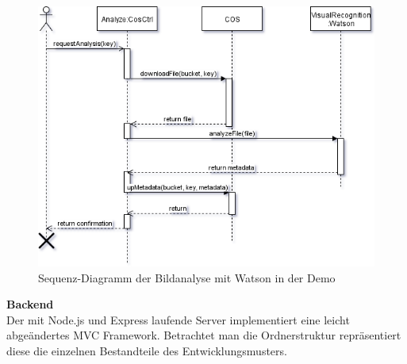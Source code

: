 \begin{figure}[hbt]
	\centering
	\includegraphics[scale=0.75]{images/demo-sequenz-diagram-watson}
	\caption{Sequenz-Diagramm der Bildanalyse mit Watson in der Demo}
	\label{fig:demosequenzdiagramwatson}
\end{figure}

\textbf{Backend}\\
Der mit Node.js und Express laufende Server implementiert eine leicht abgeändertes \ac{MVC} Framework. Betrachtet man die Ordnerstruktur repräsentiert diese die einzelnen Bestandteile des Entwicklungsmusters.

